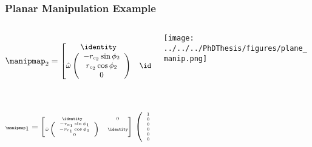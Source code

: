 \begin{frame}
	\frametitle{Planar Manipulation Example}
	\begin{columns}[c]
		\begin{column}{.5\textwidth}
			\begin{align}
			\manipmap_2 = 
			\small
			\begin{bmatrix}
			\identity & 0 \\
			\hat{\omega}\left(\begin{array}{c}
			-r_{c_2} \sin \phi_2 \\ 
			r_{c_2} \cos \phi_2  \\ 
			0 
			\end{array}\right) & \identity	
			\end{bmatrix}\,					
			\small
			\left(
			\begin{array}{cc}
			1 & 0 \\
			0 & 1 \\
			0 & 0 \\
			0 & 0 \\
			0 & 0 \\
			0 & 0
			\end{array}\right) \nonumber
			\end{align} 
			 \\
			\begin{align}
				\tiny
				\manipmap_1 = \begin{bmatrix}
				\identity & 0 \\
				\hat{\omega}
				\left(\begin{array}{c}
				-r_{c_1} \sin \phi_1 \\ 
				-r_{c_1} \cos \phi_1  \\ 
				0 \end{array}\right) & \identity	
				\end{bmatrix}\,
				\left(
				\begin{array}{cc}
				1 & 0 \\
				0 & 1 \\
				0 & 0 \\
				0 & 0 \\
				0 & 0 \\
				0 & 0
				\end{array}\right) \nonumber
			\end{align}
		\end{column}
		\tiny
		\begin{column}{.5\textwidth}
			\texttt{[image: ../../../PhDThesis/figures/plane\_manip.png]}%
		\end{column}
	\end{columns}
\end{frame}

